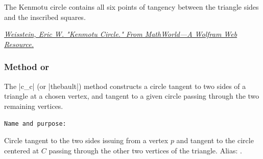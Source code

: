 The Kenmotu circle contains all six points of tangency between the triangle sides and the inscribed squares.
\begin{flushright}
\small
\href{https://mathworld.wolfram.com/KenmotuCircle.html}
{\textit{Weisstein, Eric W. "Kenmotu Circle." From MathWorld—A Wolfram Web Resource.}}
\end{flushright}

\vspace{1em}


\begin{tkzexample}[latex=6cm]
\begin{center}
\end{center}
\end{tkzexample}



\subsubsection{Method  or  }
\label{ssub:method_triangle_c_c}

The |c_c| (or |thebault|) method constructs a circle tangent to two sides of a triangle at a chosen vertex, and tangent to a given circle passing through the two remaining vertices.

\medskip
\texttt{Name and purpose: }

Circle tangent to the two sides issuing from a vertex $p$ and tangent to the circle centered at $C$ passing through the other two vertices of the triangle.
Alias: .

